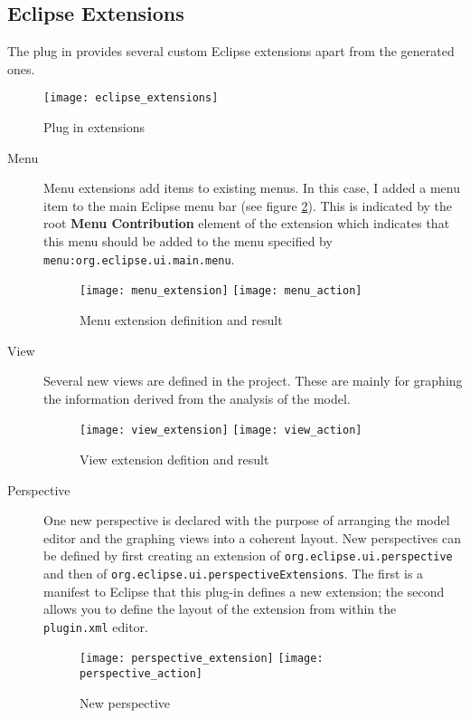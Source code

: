 \subsection{Eclipse Extensions}
The plug in provides several custom Eclipse extensions apart from the generated ones.
\begin{figure}[H]
    \centering
    \texttt{[image: eclipse\_extensions]}
    \caption{Plug in extensions}
    \label{fig:eclipse_extensions}
\end{figure}
\begin{description}
    \item[Menu] Menu extensions add items to existing menus. In this case, I added a menu item
    to the main Eclipse menu bar (see figure \ref{fig:menu_extension}). This is indicated by the root \textbf{Menu Contribution} element
    of the extension which indicates that this menu should be added to the menu specified by
    \texttt{menu:org.eclipse.ui.main.menu}.
    \begin{figure}[H]
	\centering
        \texttt{[image: menu\_extension]}
        \texttt{[image: menu\_action]}
        \caption{Menu extension definition and result}
        \label{fig:menu_extension}
    \end{figure}
    \item[View] Several new views are defined in the project. These are mainly for graphing
    the information derived from the analysis of the model.
    \begin{figure}[H]
	\centering
        \texttt{[image: view\_extension]}
        \texttt{[image: view\_action]}
        \caption{View extension defition and result}
        \label{view_extension}
    \end{figure}
    \item[Perspective] One new perspective is declared with the purpose of arranging the model editor and the 
    graphing views into a coherent layout. New perspectives can be defined by first creating an extension of
    \texttt{org.eclipse.ui.perspective} and then of \texttt{org.eclipse.ui.perspectiveExtensions}. The
    first is a manifest to Eclipse that this plug-in defines a new extension; the second allows you
    to define the layout of the extension from within the \texttt{plugin.xml} editor. 
    \begin{figure}[H]
	\centering
	\texttt{[image: perspective\_extension]}
	\texttt{[image: perspective\_action]}
	\caption{New perspective}
    \end{figure}
\end{description}

